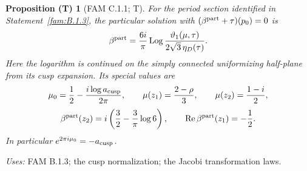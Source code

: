 \documentclass[11pt,a4paper]{article}
\theoremstyle{plain}
\newtheorem{proposition}[theorem]{Proposition (T)}
\theoremstyle{definition}
\begin{document}
\begin{proposition}[FAM C.1.1; T]\label{fam:C.1.1}
For the period section identified in Statement~\ref{fam:B.1.3}, the particular solution
with \((\beta^{\rm part}+\tau)(p_0)=0\) is
\begin{equation}\label{fam:eq:cd-beta}
 \beta^{\rm part}=\frac{6i}{\pi}\operatorname{Log}
 \frac{\vartheta_1(\mu,\tau)}{2\sqrt3\,\eta_D(\tau)}.
\end{equation}
Here the logarithm is continued on the simply connected uniformizing
half-plane from its cusp expansion. Its special values are
\[
 \mu_0=\frac12-\frac{i\log a_{\rm cusp}}{2\pi},\qquad
 \mu(z_1)=\frac{2-\rho}{3},\qquad \mu(z_2)=\frac{1-i}{2},
\]
\[
 \beta^{\rm part}(z_2)=i\left(\frac32-\frac3\pi\log6\right),
 \qquad \operatorname{Re}\beta^{\rm part}(z_1)=-\frac12.
\]
In particular \(e^{2\pi i\mu_0}=-a_{\rm cusp}\).
\end{proposition}
\noindent\textit{Uses:} FAM B.1.3; the cusp normalization; the Jacobi transformation laws.\par
\end{document}
